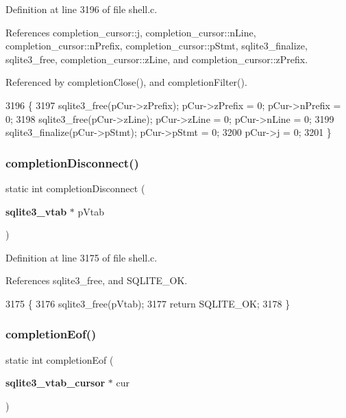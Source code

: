 Definition at line 3196 of file shell.\+c.



References completion\+\_\+cursor\+::j, completion\+\_\+cursor\+::n\+Line, completion\+\_\+cursor\+::n\+Prefix, completion\+\_\+cursor\+::p\+Stmt, sqlite3\+\_\+finalize, sqlite3\+\_\+free, completion\+\_\+cursor\+::z\+Line, and completion\+\_\+cursor\+::z\+Prefix.



Referenced by completion\+Close(), and completion\+Filter().


\begin{DoxyCode}
3196                                                           \{
3197   sqlite3_free(pCur->zPrefix);   pCur->zPrefix = 0;  pCur->nPrefix = 0;
3198   sqlite3_free(pCur->zLine);     pCur->zLine = 0;    pCur->nLine = 0;
3199   sqlite3_finalize(pCur->pStmt); pCur->pStmt = 0;
3200   pCur->j = 0;
3201 \}
\end{DoxyCode}
\mbox{\label{shell_8c_a8bde95c7ae98e590fb3d5244c0880f7a}} 
\subsubsection{completion\+Disconnect()}
{\footnotesize\ttfamily static int completion\+Disconnect (\begin{DoxyParamCaption}\item[{\textbf{ sqlite3\+\_\+vtab} $\ast$}]{p\+Vtab }\end{DoxyParamCaption})\hspace{0.3cm}{\ttfamily [static]}}



Definition at line 3175 of file shell.\+c.



References sqlite3\+\_\+free, and S\+Q\+L\+I\+T\+E\+\_\+\+OK.


\begin{DoxyCode}
3175                                                     \{
3176   sqlite3_free(pVtab);
3177   \textcolor{keywordflow}{return} SQLITE_OK;
3178 \}
\end{DoxyCode}
\mbox{\label{shell_8c_a9d41c84d9bba4c30d59cb4c7d961e7e5}} 
\subsubsection{completion\+Eof()}
{\footnotesize\ttfamily static int completion\+Eof (\begin{DoxyParamCaption}\item[{\textbf{ sqlite3\+\_\+vtab\+\_\+cursor} $\ast$}]{cur }\end{DoxyParamCaption})\hspace{0.3cm}{\ttfamily [static]}}



